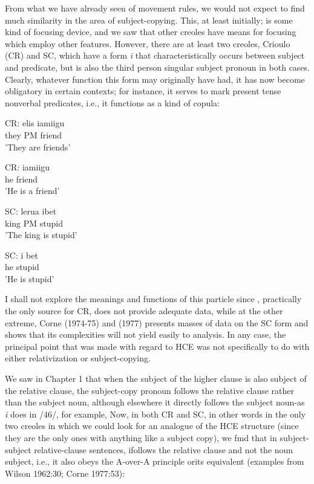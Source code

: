 From what we have already seen of movement rules, we would not expect to find much similarity in the area of subject-copying. This, at least initially; is some kind of focusing device, and we saw that other creoles have means for focusing which employ other features. However, there are at least two creoles, Crioulo (CR) and SC, which have a form \textit{i} that characteristically occurs between subject and predicate, but is also the third person singular subject pronoun in both cases. Clearly, what\-ever function this form may originally have had, it has now become obligatory in certain contexts; for instance, it serves to mark present tense nonverbal predicates, i.e., it functions as a kind of copula:

\ea\label{ex:44}
 \gll CR: elis iamiigu\\
they PM friend\\
\glt 'They are friends'
\z



\ea\label{ex:45}
 \gll CR: iamiigu\\
he friend\\
\glt'He is a friend'
\z






\ea\label{ex:46}
 \gll SC: lerua ibet\\
king PM stupid\\
\glt'The king is stupid'
\z

 

\ea\label{ex:47}
\gll SC: i bet\\
he stupid\\
\glt'He is stupid'
\z





I shall not explore the meanings and functions of this particle since \citet{Wilson1962}, practically the only source for CR, does not provide adequate data, while at the other extreme, Corne (1974-75) and (1977) presents masses of data on the SC form and shows that its complexities will not yield easily to analysis. In any case, the principal point that was made with regard to HCE was not specifically to do with either relativization or subject-copying.

We saw in Chapter 1 that when the subject of the higher clause is also subject of the relative clause, the subject-copy pronoun follows the relative clause rather than the subject noun, although elsewhere it directly follows the subject noun-as \textit{i} does in /46/, for example, Now, in both CR and SC, in other words in the only two creoles in which we could look for an analogue of the HCE structure (since they are the only ones with anything like a subject copy), we fmd that in subject-subject relative-clause sentences, ifollows the relative clause and not the noun subject, i.e., it also obeys the A-over-A principle orits equivalent (examples from Wilson 1962:30; Corne 1977:53):

